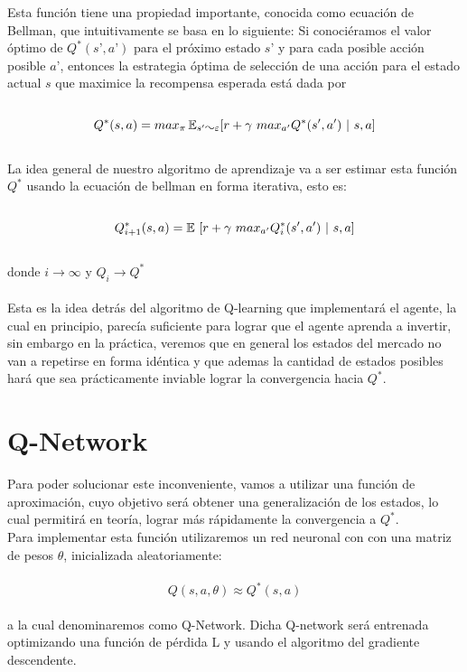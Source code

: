 Esta función tiene una propiedad importante, conocida como ecuación de Bellman, que intuitivamente se basa en lo siguiente: 
Si conociéramos el valor óptimo de $Q^*(s’, a’)$ para el próximo estado $s’$ y para cada posible acción posible $a’$, entonces la estrategia óptima de selección de una acción para el estado actual $s$ que maximice la recompensa esperada está dada por
\\\\
\begin{equation}
Q^*(s, a) = max_{\pi} \E_{s' \AC \varepsilon} [ r + \gamma \  max_{a'} Q^*(s', a') \  |  \ s, a]
\end{equation}
\\
La idea general de nuestro algoritmo de aprendizaje va a ser estimar esta función $Q^*$ usando la ecuación de bellman en forma iterativa, esto es:
\\\\
\begin{equation}
Q^*_{i+1}(s, a) = \operatorname{\mathbb{E}}\ [ r + \gamma \  max_{a'} Q_{i}^*(s', a') \  |  \ s, a]
\end{equation}
\\
donde  $i\rightarrow\infty$ y $Q_i \rightarrow Q^*$
\\\\
Esta es la idea detrás del algoritmo de Q-learning que implementará el agente, la cual en principio, parecía suficiente para lograr que el agente aprenda a invertir, sin embargo en la práctica, veremos que en general los estados del mercado no van a repetirse en forma idéntica y que ademas la cantidad de estados posibles hará que sea prácticamente inviable lograr la convergencia hacia $Q^*$.

\section{Q-Network}
Para poder solucionar este inconveniente, vamos a utilizar una función de aproximación, cuyo objetivo será obtener una generalización de los estados, lo cual permitirá en teoría, lograr más rápidamente la convergencia a $Q^*$.\\
Para implementar esta función utilizaremos un red neuronal con con una matriz de pesos $\theta$, inicializada aleatoriamente: 
\\\\
\begin{equation}
Q(s, a, \theta) \approx Q^*(s, a) 
\end{equation}
\\
a la cual denominaremos como Q-Network.
Dicha Q-network será entrenada optimizando una función de pérdida L y usando el algoritmo del gradiente descendente.
\\

